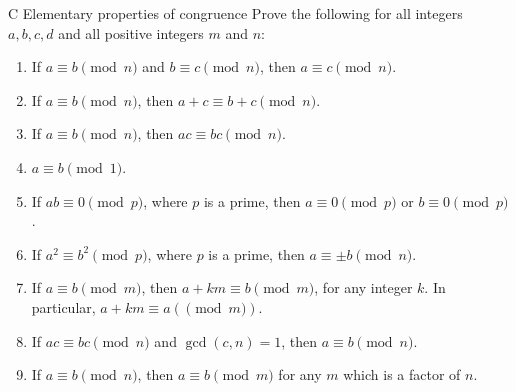 \begin{exercise}{C Elementary properties of congruence}
Prove the following for all integers $a,b,c,d$ and all positive integers $m$ and $n$:
 \begin{enumerate}
     \item If $a\equiv b\pmod{n}$ and $b\equiv c\pmod{n}$, then $a\equiv c\pmod{n}$.
     \item If $a\equiv b\pmod{n}$, then $a+c\equiv b+c \pmod{n}$.
     \item If $a\equiv b\pmod{n}$, then $ac\equiv bc\pmod{n}$.
     \item $a\equiv b\pmod{1}$.
     \item If $ab\equiv 0\pmod{p}$, where $p$ is a prime, then $a\equiv 0\pmod{p}$ or $b\equiv 0\pmod{p}$.
     \item If $a^{2}\equiv b^{2}\pmod{p}$, where $p$ is a prime, then $a\equiv \pm b\pmod{n}$.
     \item If $a\equiv b\pmod{m}$, then $a+km\equiv b\pmod{m}$, for any integer $k$. In particular, $a+km\equiv a(\pmod m)$.
     \item If $ac\equiv bc\pmod{n}$ and $\gcd(c,n)=1$, then $a\equiv b\pmod{n}$.
     \item If $a\equiv b\pmod{n}$, then $a\equiv b\pmod{m}$ for any $m$ which is a factor of $n$.
 \end{enumerate}
\end{exercise}
